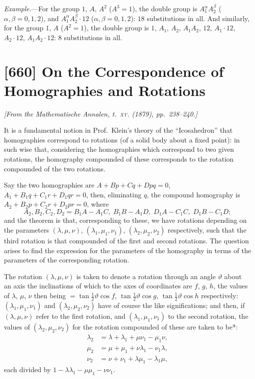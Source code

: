 \documentclass[11pt,a4paper]{book}
\begin{document}
\medskip

\noindent\textit{Example.}---For the group $1$, $A$, $A^2$ ($A^3 = 1$), the double group is $A_1^\alpha A_2^\beta$ ($\alpha, \beta = 0, 1, 2$), and $A_1^\alpha A_2^\beta \cdot 12$ ($\alpha, \beta = 0, 1, 2$): $18$ substitutions in all. And similarly, for the group $1$, $A$ ($A^2 = 1$), the double group is $1$, $A_1$, $A_2$, $A_1 A_2$, $12$, $A_1 \cdot 12$, $A_2 \cdot 12$, $A_1 A_2 \cdot 12$: $8$ substitutions in all.

\newpage
\section{[660] On the Correspondence of Homographies and Rotations}
\label{sec:660}

\noindent\textit{[From the \emph{Mathematische Annalen}, t.~\textsc{xv}. (1879), pp.~238--240.]}

\medskip

It is a fundamental notion in Prof.~Klein's theory of the ``Icosahedron'' that homographies correspond to rotations (of a solid body about a fixed point): in such wise that, considering the homographies which correspond to two given rotations, the homography compounded of these corresponds to the rotation compounded of the two rotations.

Say the two homographies are $A + Bp + Cq + Dpq = 0$, $A_1 + B_1 q + C_1 r + D_1 qr = 0$, then, eliminating $q$, the compound homography is $A_2 + B_2 p + C_2 r + D_2 pr = 0$, where
\[
A_2, B_2, C_2, D_2 = B_1 A - A_1 C, \; B_1 B - A_1 D, \; D_1 A - C_1 C, \; D_1 B - C_1 D;
\]
and the theorem is that, corresponding to these, we have rotations depending on the parameters $(\lambda, \mu, \nu)$, $(\lambda_1, \mu_1, \nu_1)$, $(\lambda_2, \mu_2, \nu_2)$ respectively, such that the third rotation is that compounded of the first and second rotations. The question arises to find the expression for the parameters of the homography in terms of the parameters of the corresponding rotation.

The rotation $(\lambda, \mu, \nu)$ is taken to denote a rotation through an angle $\vartheta$ about an axis the inclinations of which to the axes of coordinates are $f$, $g$, $h$, the values of $\lambda$, $\mu$, $\nu$ then being $= \tan\frac{1}{2}\vartheta \cos f$, $\tan\frac{1}{2}\vartheta \cos g$, $\tan\frac{1}{2}\vartheta \cos h$ respectively: $(\lambda_1, \mu_1, \nu_1)$ and $(\lambda_2, \mu_2, \nu_2)$ have of course the like significations; and then, if $(\lambda, \mu, \nu)$ refer to the first rotation, and $(\lambda_1, \mu_1, \nu_1)$ to the second rotation, the values of $(\lambda_2, \mu_2, \nu_2)$ for the rotation compounded of these are taken to be*:
\begin{align*}
\lambda_2 &= \lambda + \lambda_1 + \mu\nu_1 - \mu_1\nu, \\
\mu_2 &= \mu + \mu_1 + \nu\lambda_1 - \nu_1\lambda, \\
\nu_2 &= \nu + \nu_1 + \lambda\mu_1 - \lambda_1\mu,
\end{align*}
each divided by $1 - \lambda\lambda_1 - \mu\mu_1 - \nu\nu_1$.
\end{document}
